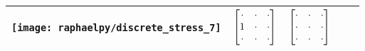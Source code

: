\begin{table}
\begin{tabular}{|C{2cm}|C{2cm}|C{2cm}|C{2cm}|C{2cm}|}
		\texttt{[image: raphaelpy/discrete\_stress\_7]}
		&
		$\begin{bmatrix}
			\cdot & \cdot & \cdot \\
			 1 & \cdot & \cdot \\
			\cdot & \cdot & \cdot \\
		\end{bmatrix}$
		&
		$\begin{bmatrix}
			\cdot & \cdot & \cdot \\
			\cdot & \cdot & \cdot \\
			\cdot & \cdot & \cdot \\
		\end{bmatrix}$
		\\
		\hline

	\end{tabular}
	\label{tabDiscreteStressExamples1}
\end{table}

